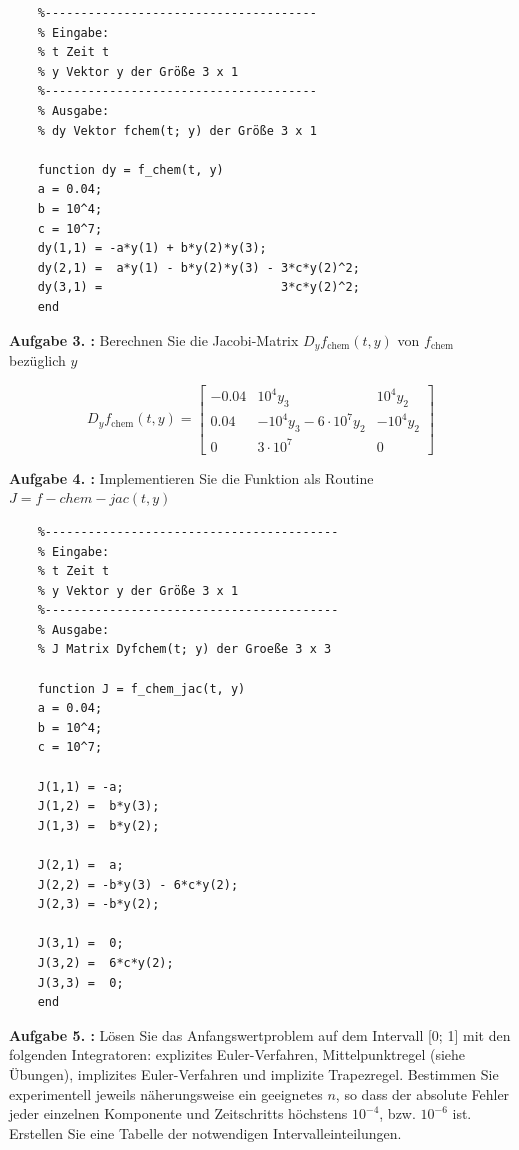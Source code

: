 \begin{lstlisting}[style=Matlab-editor]
	% dy=f_chem(t,y)
	%--------------------------------------
	% Eingabe:
	% t Zeit t
	% y Vektor y der Größe 3 x 1
	%--------------------------------------
	% Ausgabe:
	% dy Vektor fchem(t; y) der Größe 3 x 1

	function dy = f_chem(t, y)
	a = 0.04;
	b = 10^4;
	c = 10^7;
	dy(1,1) = -a*y(1) + b*y(2)*y(3);
	dy(2,1) =  a*y(1) - b*y(2)*y(3) - 3*c*y(2)^2;
	dy(3,1) =                         3*c*y(2)^2;
	end
\end{lstlisting}


\begin{mybox}
	\textbf{Aufgabe 3. :}	Berechnen Sie die Jacobi-Matrix $ D_yf_{\mathrm{chem}}(t,y) $ von $ f_{\mathrm{chem}} $ bezüglich $ y $
\end{mybox} 

\begin{equation}
	D_yf_{\mathrm{chem}}(t,y) =
\begin{bmatrix}
	-0.04 & 10^4y_3 & 10^4y_2 \\
	0.04 & -10^4y_3-6\cdot 10^7y_2 & -10^4y_2 \\
	0 & 3\cdot 10^7 & 0 
\end{bmatrix}
\end{equation}

\begin{mybox}
	\textbf{Aufgabe 4. :}	Implementieren Sie die Funktion als Routine $ J = f-chem-jac(t,y) $
\end{mybox}
 
\begin{lstlisting}[style=Matlab-editor]
	% J=f_chem_jac(t,y)
	%-----------------------------------------
	% Eingabe:
	% t Zeit t
	% y Vektor y der Größe 3 x 1
	%-----------------------------------------
	% Ausgabe:
	% J Matrix Dyfchem(t; y) der Groeße 3 x 3

	function J = f_chem_jac(t, y)
	a = 0.04;
	b = 10^4;
	c = 10^7;

	J(1,1) = -a;
	J(1,2) =  b*y(3); 
	J(1,3) =  b*y(2);

	J(2,1) =  a;
	J(2,2) = -b*y(3) - 6*c*y(2);
	J(2,3) = -b*y(2);

	J(3,1) =  0;
	J(3,2) =  6*c*y(2);
	J(3,3) =  0;
	end
\end{lstlisting}

\begin{mybox}
	\textbf{Aufgabe 5. :}	Lösen Sie das Anfangswertproblem auf dem Intervall [0; 1] mit den folgenden Integratoren: explizites
	Euler-Verfahren, Mittelpunktregel (siehe Übungen), implizites Euler-Verfahren und implizite
	Trapezregel. Bestimmen Sie experimentell jeweils näherungsweise ein geeignetes $n$, so dass der absolute Fehler jeder einzelnen Komponente und Zeitschritts höchstens $10^{-4}$, bzw. $10^{-6}$ ist.
	Erstellen Sie eine Tabelle der notwendigen Intervalleinteilungen.
\end{mybox}

